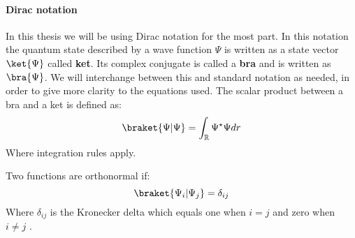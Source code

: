 \documentclass[../master_thesis.tex]{subfiles}
\begin{document}
\paragraph{Dirac notation}
In this thesis we will be using Dirac notation for the most part. In this notation
the quantum state described by a wave function $\Psi$ is written as a state vector
$\ket{\Psi}$ \cite{Atkins:2011} called \textbf{ket}. Its complex conjugate is called
a \textbf{bra} and is written as $\bra{\Psi}$. We will interchange between this and standard notation
as needed, in order to give more clarity to the equations used.
The scalar product between a bra and a ket is defined as:
\begin{equation}
  \braket{\Psi|\Psi} = \int_{\mathbb{R}} \Psi^{\star}\Psi dr \label{eq:diracscalpro}
\end{equation}
Where integration rules apply.

Two functions are orthonormal if:
\begin{equation}
    \braket{\Psi_i|\Psi_j} = \delta_{ij}
\end{equation}
Where $\delta_{ij}$ is the Kronecker delta which equals one when $i = j$ and
zero when $ i \neq j$ \cite{Atkins:2011, Cohen:1973}.

\biblio
\end{document}
